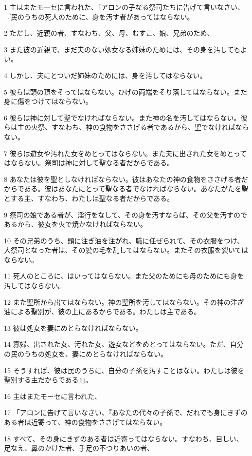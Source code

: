 \par 1 主はまたモーセに言われた、「アロンの子なる祭司たちに告げて言いなさい、『民のうちの死人のために、身を汚す者があってはならない。
\par 2 ただし、近親の者、すなわち、父、母、むすこ、娘、兄弟のため、
\par 3 また彼の近親で、まだ夫のない処女なる姉妹のためには、その身を汚してもよい。
\par 4 しかし、夫にとついだ姉妹のためには、身を汚してはならない。
\par 5 彼らは頭の頂をそってはならない。ひげの両端をそり落してはならない。また身に傷をつけてはならない。
\par 6 彼らは神に対して聖でなければならない。また神の名を汚してはならない。彼らは主の火祭、すなわち、神の食物をささげる者であるから、聖でなければならない。
\par 7 彼らは遊女や汚れた女をめとってはならない。また夫に出された女をめとってはならない。祭司は神に対して聖なる者だからである。
\par 8 あなたは彼を聖としなければならない。彼はあなたの神の食物をささげる者だからである。彼はあなたにとって聖なる者でなければならない。あなたがたを聖とする主、すなわち、わたしは聖なる者だからである。
\par 9 祭司の娘である者が、淫行をなして、その身を汚すならば、その父を汚すのであるから、彼女を火で焼かなければならない。
\par 10 その兄弟のうち、頭に注ぎ油を注がれ、職に任ぜられて、その衣服をつけ、大祭司となった者は、その髪の毛を乱してはならない。またその衣服を裂いてはならない。
\par 11 死人のところに、はいってはならない。また父のためにも母のためにも身を汚してはならない。
\par 12 また聖所から出てはならない。神の聖所を汚してはならない。その神の注ぎ油による聖別が、彼の上にあるからである。わたしは主である。
\par 13 彼は処女を妻にめとらなければならない。
\par 14 寡婦、出された女、汚れた女、遊女などをめとってはならない。ただ、自分の民のうちの処女を、妻にめとらなければならない。
\par 15 そうすれば、彼は民のうちに、自分の子孫を汚すことはない。わたしは彼を聖別する主だからである』」。
\par 16 主はまたモーセに言われた、
\par 17 「アロンに告げて言いなさい、『あなたの代々の子孫で、だれでも身にきずのある者は近寄って、神の食物をささげてはならない。
\par 18 すべて、その身にきずのある者は近寄ってはならない。すなわち、目しい、足なえ、鼻のかけた者、手足の不つりあいの者、
